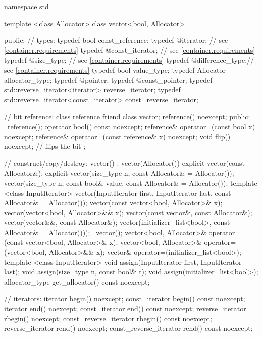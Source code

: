 \begin{codeblock}
namespace std {
  template <class Allocator> class vector<bool, Allocator> {
  public:
    // types:
    typedef bool                                  const_reference;
    typedef @\impdef@                iterator;       // see \ref{container.requirements}
    typedef @\impdef@                const_iterator; // see \ref{container.requirements}
    typedef @\impdef@                size_type;      // see \ref{container.requirements}
    typedef @\impdef@                difference_type;// see \ref{container.requirements}
    typedef bool                                  value_type;
    typedef Allocator                             allocator_type;
    typedef @\impdef@                pointer;
    typedef @\impdef@                const_pointer;
    typedef std::reverse_iterator<iterator>       reverse_iterator;
    typedef std::reverse_iterator<const_iterator> const_reverse_iterator;

    // bit reference:
    class reference {
      friend class vector;
      reference() noexcept;
    public:
      ~reference();
      operator bool() const noexcept;
      reference& operator=(const bool x) noexcept;
      reference& operator=(const reference& x) noexcept;
      void flip() noexcept;     // flips the bit
    };

    // construct/copy/destroy:
    vector() : vector(Allocator()) { }
    explicit vector(const Allocator&);
    explicit vector(size_type n, const Allocator& = Allocator());
    vector(size_type n, const bool& value,
           const Allocator& = Allocator());
    template <class InputIterator>
      vector(InputIterator first, InputIterator last,
             const Allocator& = Allocator());
    vector(const vector<bool, Allocator>& x);
    vector(vector<bool, Allocator>&& x);
    vector(const vector&, const Allocator&);
    vector(vector&&, const Allocator&);
    vector(initializer_list<bool>, const Allocator& = Allocator()));
   ~vector();
    vector<bool, Allocator>& operator=(const vector<bool, Allocator>& x);
    vector<bool, Allocator>& operator=(vector<bool, Allocator>&& x);
    vector& operator=(initializer_list<bool>);
    template <class InputIterator>
      void assign(InputIterator first, InputIterator last);
    void assign(size_type n, const bool& t);
    void assign(initializer_list<bool>);
    allocator_type get_allocator() const noexcept;

    // iterators:
    iterator               begin() noexcept;
    const_iterator         begin() const noexcept;
    iterator               end() noexcept;
    const_iterator         end() const noexcept;
    reverse_iterator       rbegin() noexcept;
    const_reverse_iterator rbegin() const noexcept;
    reverse_iterator       rend() noexcept;
    const_reverse_iterator rend() const noexcept;

}}
\end{codeblock}
